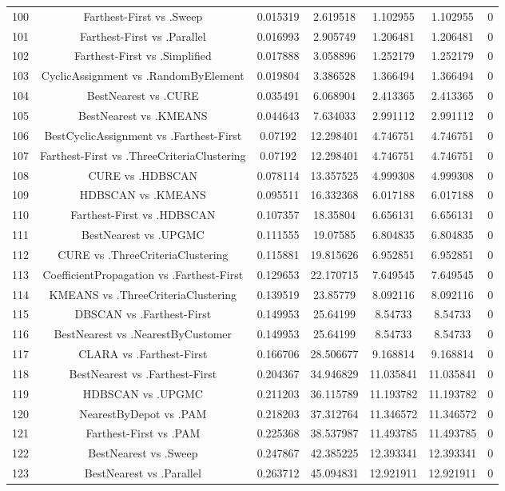 \documentclass[a4paper,10pt]{article}
\begin{document}
\begin{landscape}
\begin{table}[!htp]
\begin{tabular}{ccccccc}
100&Farthest-First vs .Sweep&0.015319&2.619518&1.102955&1.102955&0\\
101&Farthest-First vs .Parallel&0.016993&2.905749&1.206481&1.206481&0\\
102&Farthest-First vs .Simplified&0.017888&3.058896&1.252179&1.252179&0\\
103&CyclicAssignment vs .RandomByElement&0.019804&3.386528&1.366494&1.366494&0\\
104&BestNearest vs .CURE&0.035491&6.068904&2.413365&2.413365&0\\
105&BestNearest vs .KMEANS&0.044643&7.634033&2.991112&2.991112&0\\
106&BestCyclicAssignment vs .Farthest-First&0.07192&12.298401&4.746751&4.746751&0\\
107&Farthest-First vs .ThreeCriteriaClustering&0.07192&12.298401&4.746751&4.746751&0\\
108&CURE vs .HDBSCAN&0.078114&13.357525&4.999308&4.999308&0\\
109&HDBSCAN vs .KMEANS&0.095511&16.332368&6.017188&6.017188&0\\
110&Farthest-First vs .HDBSCAN&0.107357&18.35804&6.656131&6.656131&0\\
111&BestNearest vs .UPGMC&0.111555&19.07585&6.804835&6.804835&0\\
112&CURE vs .ThreeCriteriaClustering&0.115881&19.815626&6.952851&6.952851&0\\
113&CoefficientPropagation vs .Farthest-First&0.129653&22.170715&7.649545&7.649545&0\\
114&KMEANS vs .ThreeCriteriaClustering&0.139519&23.85779&8.092116&8.092116&0\\
115&DBSCAN vs .Farthest-First&0.149953&25.64199&8.54733&8.54733&0\\
116&BestNearest vs .NearestByCustomer&0.149953&25.64199&8.54733&8.54733&0\\
117&CLARA vs .Farthest-First&0.166706&28.506677&9.168814&9.168814&0\\
118&BestNearest vs .Farthest-First&0.204367&34.946829&11.035841&11.035841&0\\
119&HDBSCAN vs .UPGMC&0.211203&36.115789&11.193782&11.193782&0\\
120&NearestByDepot vs .PAM&0.218203&37.312764&11.346572&11.346572&0\\
121&Farthest-First vs .PAM&0.225368&38.537987&11.493785&11.493785&0\\
122&BestNearest vs .Sweep&0.247867&42.385225&12.393341&12.393341&0\\
123&BestNearest vs .Parallel&0.263712&45.094831&12.921911&12.921911&0\\

\end{tabular}
\end{table}
\end{landscape}
\end{document}
